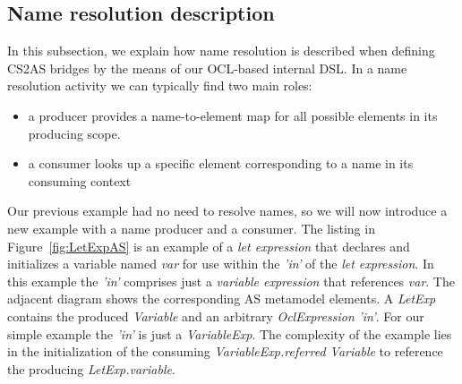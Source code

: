 \documentclass{llncs}
\begin{document}

\subsection{Name resolution description}
\label{subsec:nameReso}
In this subsection, we explain how name resolution is described when defining CS2AS bridges by the means of our OCL-based internal DSL. In a name resolution activity we can typically find two main roles:
\begin{itemize}
\item a producer provides a name-to-element map for all possible elements in its producing scope. 
\item a consumer looks up a specific element corresponding to a name in its consuming context
\end{itemize}

Our previous example had no need to resolve names, so we will now introduce a new example with a name producer and a consumer. The listing in Figure~\ref{fig:LetExpAS} is an example of a \textit{let expression} that declares and initializes a variable named \emph{var} for use within the \emph{'in'} of the \textit{let expression}. In this example the  \emph{'in'} comprises just a \textit{variable expression} that references  \emph{var}. The adjacent diagram shows the corresponding AS metamodel elements. A \emph{LetExp} contains the produced \emph{Variable} and an arbitrary \emph{OclExpression}  \emph{'in'}. For our simple example the  \emph{'in'} is just a \emph{VariableExp}. The complexity of the example lies in the initialization of the consuming \emph{VariableExp.referred Variable} to reference the producing \emph{LetExp.variable}.
\end{document}
